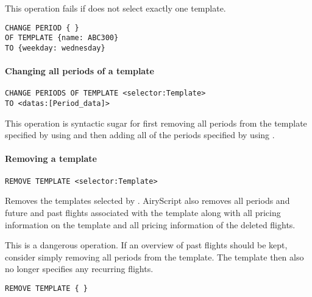 This operation fails if  does not select exactly one
template.

\begin{texa}
  \begin{lstlisting}
CHANGE PERIOD { }
OF TEMPLATE {name: ABC300}
TO {weekday: wednesday}
  \end{lstlisting}
\end{texa}

\paragraph{Changing all periods of a template}
\begin{operation}
  \label{op:change_periods}
  \begin{lstlisting}
CHANGE PERIODS OF TEMPLATE <selector:Template>
TO <datas:[Period_data]>
  \end{lstlisting}
\end{operation}
This operation is syntactic sugar for first removing all periods from the
template specified by  using  and then
adding all of the periods specified by  using
.

\paragraph{Removing a template}
\begin{operation}
  \lstinline{REMOVE TEMPLATE <selector:Template>}
\end{operation}
Removes the templates selected by . AiryScript also removes all
periods and future and past flights associated with the template along with all
pricing information on the template and all pricing information of the deleted
flights.

This is a dangerous operation. If an overview of past flights should be kept,
consider simply removing all periods from the template. The template then also
no longer specifies any recurring flights.

\begin{texa}
  \begin{lstlisting}
REMOVE TEMPLATE { }
  \end{lstlisting}
\end{texa}

